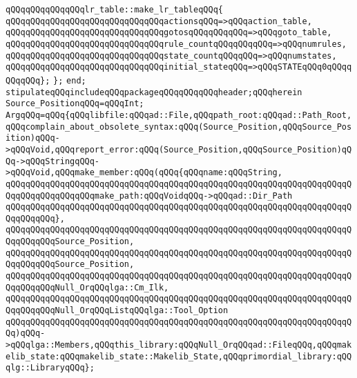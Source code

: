 \newline
\verb|qQQqqQQqqQQqqQQqlr_table::make_lr_tableqQQq{|\newline
\verb|qQQqqQQqqQQqqQQqqQQqqQQqqQQqqQQqactionsqQQq=>qQQqaction_table,|\newline
\verb|qQQqqQQqqQQqqQQqqQQqqQQqqQQqqQQqgotosqQQqqQQqqQQq=>qQQqgoto_table,|\newline
\verb|qQQqqQQqqQQqqQQqqQQqqQQqqQQqqQQqrule_countqQQqqQQqqQQq=>qQQqnumrules,|\newline
\verb|qQQqqQQqqQQqqQQqqQQqqQQqqQQqqQQqstate_countqQQqqQQq=>qQQqnumstates,|\newline
\verb|qQQqqQQqqQQqqQQqqQQqqQQqqQQqqQQqinitial_stateqQQq=>qQQqSTATEqQQq0qQQqqQQqqQQq};|\newline
\verb|};|\newline
\verb|end;|\newline
\verb|stipulateqQQqincludeqQQqpackageqQQqqQQqqQQqheader;qQQqherein|\newline
\verb|Source_PositionqQQq=qQQqInt;|\newline
\verb|ArgqQQq=qQQq{qQQqlibfile:qQQqad::File,qQQqpath_root:qQQqad::Path_Root,qQQqcomplain_about_obsolete_syntax:qQQq(Source_Position,qQQqSource_Position)qQQq->qQQqVoid,qQQqreport_error:qQQq(Source_Position,qQQqSource_Position)qQQq->qQQqStringqQQq->qQQqVoid,qQQqmake_member:qQQq(qQQq{qQQqname:qQQqString,|\newline
\verb|qQQqqQQqqQQqqQQqqQQqqQQqqQQqqQQqqQQqqQQqqQQqqQQqqQQqqQQqqQQqqQQqqQQqqQQqqQQqqQQqqQQqqQQqmake_path:qQQqVoidqQQq->qQQqad::Dir_Path|\newline
\verb|qQQqqQQqqQQqqQQqqQQqqQQqqQQqqQQqqQQqqQQqqQQqqQQqqQQqqQQqqQQqqQQqqQQqqQQqqQQqqQQq},|\newline
\verb|qQQqqQQqqQQqqQQqqQQqqQQqqQQqqQQqqQQqqQQqqQQqqQQqqQQqqQQqqQQqqQQqqQQqqQQqqQQqqQQqSource_Position,|\newline
\verb|qQQqqQQqqQQqqQQqqQQqqQQqqQQqqQQqqQQqqQQqqQQqqQQqqQQqqQQqqQQqqQQqqQQqqQQqqQQqqQQqSource_Position,|\newline
\verb|qQQqqQQqqQQqqQQqqQQqqQQqqQQqqQQqqQQqqQQqqQQqqQQqqQQqqQQqqQQqqQQqqQQqqQQqqQQqqQQqNull_OrqQQqlga::Cm_Ilk,|\newline
\verb|qQQqqQQqqQQqqQQqqQQqqQQqqQQqqQQqqQQqqQQqqQQqqQQqqQQqqQQqqQQqqQQqqQQqqQQqqQQqqQQqNull_OrqQQqListqQQqlga::Tool_Option|\newline
\verb|qQQqqQQqqQQqqQQqqQQqqQQqqQQqqQQqqQQqqQQqqQQqqQQqqQQqqQQqqQQqqQQqqQQqqQQq)qQQq->qQQqlga::Members,qQQqthis_library:qQQqNull_OrqQQqad::FileqQQq,qQQqmakelib_state:qQQqmakelib_state::Makelib_State,qQQqprimordial_library:qQQqlg::LibraryqQQq};|\newline
